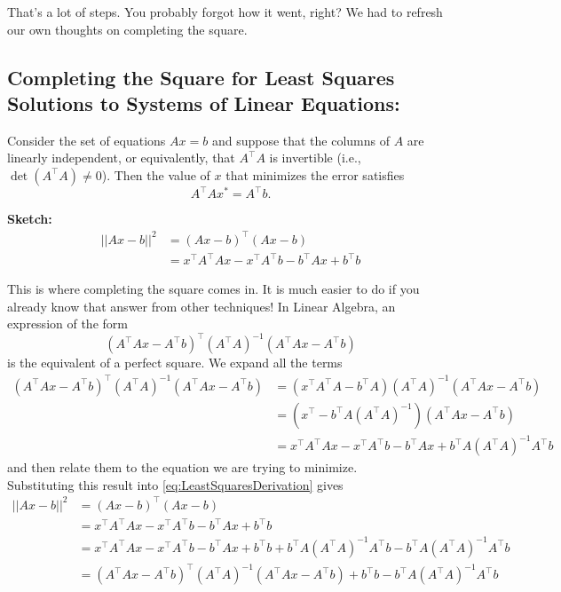 That's a lot of steps. You probably forgot how it went, right? We had to refresh our own thoughts on completing the square.  

\subsection{Completing the Square for Least Squares Solutions to Systems of Linear Equations:} 
Consider the set of equations $Ax=b$ and suppose that the columns of $A$ are linearly independent, or equivalently, that $A^\top A$ is invertible (i.e., $\det(A^\top A) \neq 0$). Then the value of $x$ that minimizes the error satisfies
$$A^\top A x^\ast = A^\top b. $$

\textbf{Sketch:} 
\begin{equation}
    \label{eq:LeastSquaresDerivation}
\begin{aligned}
    ||Ax-b||^2&=(Ax-b)^\top (Ax-b) \\
    &= x^\top A^\top A x -x^\top A^\top b - b^\top A x + b^\top b
\end{aligned}
\end{equation}

This is where completing the square comes in. It is much easier to do if you already know that answer from other techniques! In Linear Algebra, an expression of the form
$$\boxed{\left( A^\top A x - A^\top b \right)^\top \left(A^\top A \right)^{-1}   \left( A^\top A x - A^\top b \right)}$$
 is the equivalent of a perfect square. We expand all the terms 
\begin{align*}
\left( A^\top A x - A^\top b \right)^\top \left(A^\top A \right)^{-1}   \left( A^\top A x - A^\top b \right) &=
    \left(x^\top A^\top A - b^\top A \right) \left(A^\top A \right)^{-1}   \left( A^\top A x - A^\top b \right) \\
    &=  \left(x^\top - b^\top A \left(A^\top A \right)^{-1}\right)  \left( A^\top A x - A^\top b \right) \\
    &= x^\top A^\top A x -x^\top A^\top b -b^\top A x +b^\top A\left(A^\top A \right)^{-1} A^\top b
\end{align*}
and then relate them to the equation we are trying to minimize.\\

Substituting this result into \eqref{eq:LeastSquaresDerivation} gives
\begin{align*}
    ||Ax-b||^2&=(Ax-b)^\top (Ax-b) \\
    &= x^\top A^\top A x -x^\top A^\top b - b^\top A x + b^\top b\\
    &=x^\top A^\top A x -x^\top A^\top b - b^\top A x + b^\top b + b^\top A \left(A^\top A \right)^{-1}  A^\top b- b^\top A \left(A^\top A \right)^{-1}  A^\top b\\
    &=\left( A^\top A x - A^\top b \right)^\top \left(A^\top A \right)^{-1}   \left( A^\top A x - A^\top b \right) +b^\top b - b^\top A \left(A^\top A \right)^{-1}  A^\top b
\end{align*}

